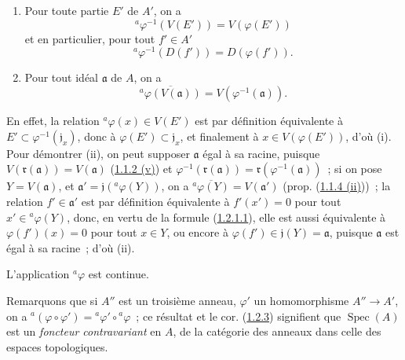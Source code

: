 \begin{proposition}[1.2.2]
\label{I.1.2.2-fr}
\begin{enumerate}
  \item[\rm(i)] Pour toute partie $E'$ de $A'$, on a
  \begin{equation}
    {}^a\varphi^{-1}(V(E'))=V(\varphi(E'))
    \tag{1.2.2.1}\label{I.1.2.2.1-fr}
  \end{equation}
  et en particulier, pour tout $f'\in A'$
  \begin{equation}
    {}^a\varphi^{-1}(D(f'))=D(\varphi(f')).
    \tag{1.2.2.2}\label{I.1.2.2.2-fr}
  \end{equation}
  \item[\rm(ii)] Pour tout idéal $\mathfrak{a}$ de $A$, on a
  \begin{equation}
    \overline{{}^a\varphi(V(\mathfrak{a}))}
    =V(\varphi^{-1}(\mathfrak{a})).
    \tag{1.2.2.3}\label{I.1.2.2.3-fr}
  \end{equation}
\end{enumerate}
\end{proposition}

En effet, la relation ${}^a\varphi(x)\in V(E')$ est par définition
équivalente à $E'\subset\varphi^{-1}(\mathfrak{j}_x)$, donc à
$\varphi(E')\subset\mathfrak{j}_x$, et finalement à
$x\in V(\varphi(E'))$, d'où (i). Pour démontrer (ii), on peut supposer
$\mathfrak{a}$ égal à sa racine, puisque
$V(\mathfrak{r}(\mathfrak{a}))=V(\mathfrak{a})$
(\hyperref[I.1.1.2-fr]{1.1.2 (v)}) et
$\varphi^{-1}(\mathfrak{r}(\mathfrak{a}))
=\mathfrak{r}(\varphi^{-1}(\mathfrak{a}))$~; si on pose
$Y=V(\mathfrak{a})$, et
$\mathfrak{a}'=\mathfrak{j}({}^a\varphi(Y))$, on a
$\overline{{}^a\varphi(Y)}=V(\mathfrak{a}')$ (prop.
(\hyperref[I.1.1.4-fr]{1.1.4 (ii)}))~; la relation
$f'\in\mathfrak{a}'$ est par définition équivalente à $f'(x')=0$ pour tout
$x'\in{}^a\varphi(Y)$, donc, en vertu de la formule
(\hyperref[I.1.2.1.1-fr]{1.2.1.1}), elle est aussi équivalente à
$\varphi(f')(x)=0$ pour tout $x\in Y$, ou encore à
$\varphi(f')\in\mathfrak{j}(Y)=\mathfrak{a}$, puisque $\mathfrak{a}$ est
égal à sa racine~; d'où (ii).

\begin{corollary}[1.2.3]
\label{I.1.2.3-fr}
L'application ${}^a\varphi$ est continue.
\end{corollary}

Remarquons que si $A''$ est un troisième anneau, $\varphi'$ un homomorphisme
$A''\to A'$, on a
${}^a(\varphi\circ\varphi')={}^a\varphi'\circ{}^a\varphi$~; ce résultat et le
cor. (\hyperref[I.1.2.3-fr]{1.2.3}) signifient que
$\operatorname{Spec}(A)$ est un \emph{foncteur contravariant} en $A$, de la
catégorie des anneaux dans celle des espaces topologiques.

